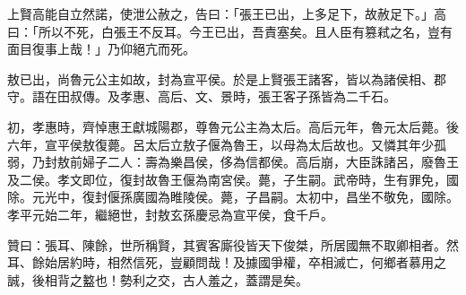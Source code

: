 \begin{pinyinscope}
上賢高能自立然諾，使泄公赦之，告曰：「張王已出，上多足下，故赦足下。」高曰：「所以不死，白張王不反耳。今王已出，吾責塞矣。且人臣有篡弒之名，豈有面目復事上哉！」乃仰絕亢而死。

敖已出，尚魯元公主如故，封為宣平侯。於是上賢張王諸客，皆以為諸侯相、郡守。語在田叔傳。及孝惠、高后、文、景時，張王客子孫皆為二千石。

初，孝惠時，齊悼惠王獻城陽郡，尊魯元公主為太后。高后元年，魯元太后薨。後六年，宣平侯敖復薨。呂太后立敖子偃為魯王，以母為太后故也。又憐其年少孤弱，乃封敖前婦子二人：壽為樂昌侯，侈為信都侯。高后崩，大臣誅諸呂，廢魯王及二侯。孝文即位，復封故魯王偃為南宮侯。薨，子生嗣。武帝時，生有罪免，國除。元光中，復封偃孫廣國為睢陵侯。薨，子昌嗣。太初中，昌坐不敬免，國除。孝平元始二年，繼絕世，封敖玄孫慶忌為宣平侯，食千戶。

贊曰：張耳、陳餘，世所稱賢，其賓客廝役皆天下俊桀，所居國無不取卿相者。然耳、餘始居約時，相然信死，豈顧問哉！及據國爭權，卒相滅亡，何鄉者慕用之誠，後相背之盭也！勢利之交，古人羞之，蓋謂是矣。


\end{pinyinscope}
